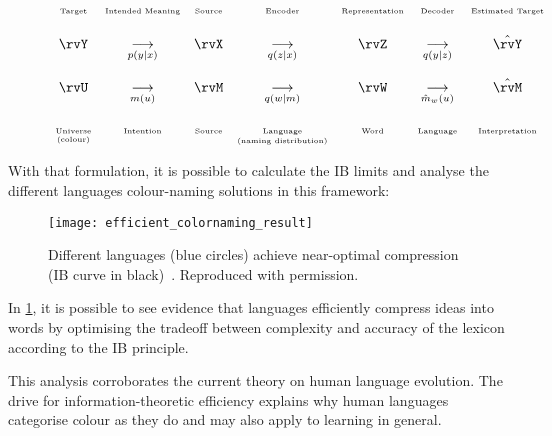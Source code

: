     \begin{figure}[ht!]
        \centering
        \begin{align*}
            \begin{array}{ccccccc}
                \tiny \text{Target} & \tiny \text{Intended Meaning} &\tiny \text{Source} &\tiny \text{Encoder} & \tiny \text{Representation}&\tiny \text{Decoder}  &\tiny \text{Estimated Target}\hspace{\fill} \\
                    \\
                \rvY &\underset{p(y|x)}{\longrightarrow} &\rvX &\underset{q(z|x)}{\longrightarrow}&\rvZ&\underset{q(y|z)}{\longrightarrow}  &\hat{\rvY} \\ \\
                \rvU &\underset{m(u)}{\longrightarrow} &\rvM &\underset{q(w|m)}{\longrightarrow}&\rvW&\underset{\hat{m}_w(u)}{\longrightarrow}  &\hat{\rvM} \\ \\
                \tiny \underset{ \text{\tiny(colour)}}{\text{Universe}} & \tiny \text{Intention} &\tiny \text{Source} &\tiny \underset{\text{\tiny (naming distribution)}}{\text{Language}}&\tiny \text{Word}&\tiny \text{Language}  &\tiny \text{Interpretation}
            \end{array}
        \end{align*}
    \end{figure}

    With that formulation, it is possible to calculate the IB limits and analyse the different languages colour-naming solutions in this framework:
    \begin{figure}[hbt!]
        \centering
        \texttt{[image: efficient\_colornaming\_result]}
        \caption{Different languages (blue circles) achieve near-optimal compression (IB curve in black)~\cite{zaslavsky:2018}. Reproduced with permission.}\label{efficient_colornaming_result}
    \end{figure}

    In \cref{efficient_colornaming_result}, it is possible to see evidence that languages efficiently compress ideas into words by optimising the tradeoff between complexity and accuracy of the lexicon according to the IB principle.

    This analysis corroborates the current theory on human language evolution. The drive for information-theoretic efficiency explains why human languages categorise colour as they do and may also apply to learning in general.

